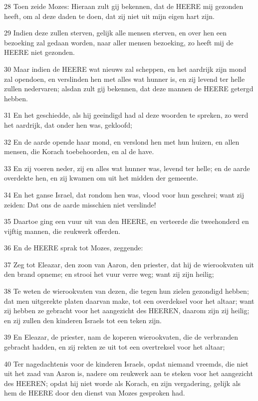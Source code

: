 \par 28 Toen zeide Mozes: Hieraan zult gij bekennen, dat de HEERE mij gezonden heeft, om al deze daden te doen, dat zij niet uit mijn eigen hart zijn.
\par 29 Indien deze zullen sterven, gelijk alle mensen sterven, en over hen een bezoeking zal gedaan worden, naar aller mensen bezoeking, zo heeft mij de HEERE niet gezonden.
\par 30 Maar indien de HEERE wat nieuws zal scheppen, en het aardrijk zijn mond zal opendoen, en verslinden hen met alles wat hunner is, en zij levend ter helle zullen nedervaren; alsdan zult gij bekennen, dat deze mannen de HEERE getergd hebben.
\par 31 En het geschiedde, als hij geeindigd had al deze woorden te spreken, zo werd het aardrijk, dat onder hen was, gekloofd;
\par 32 En de aarde opende haar mond, en verslond hen met hun huizen, en allen mensen, die Korach toebehoorden, en al de have.
\par 33 En zij voeren neder, zij en alles wat hunner was, levend ter helle; en de aarde overdekte hen, en zij kwamen om uit het midden der gemeente.
\par 34 En het ganse Israel, dat rondom hen was, vlood voor hun geschrei; want zij zeiden: Dat ons de aarde misschien niet verslinde!
\par 35 Daartoe ging een vuur uit van den HEERE, en verteerde die tweehonderd en vijftig mannen, die reukwerk offerden.
\par 36 En de HEERE sprak tot Mozes, zeggende:
\par 37 Zeg tot Eleazar, den zoon van Aaron, den priester, dat hij de wierookvaten uit den brand opneme; en strooi het vuur verre weg; want zij zijn heilig;
\par 38 Te weten de wierookvaten van dezen, die tegen hun zielen gezondigd hebben; dat men uitgerekte platen daarvan make, tot een overdeksel voor het altaar; want zij hebben ze gebracht voor het aangezicht des HEEREN, daarom zijn zij heilig; en zij zullen den kinderen Israels tot een teken zijn.
\par 39 En Eleazar, de priester, nam de koperen wierookvaten, die de verbranden gebracht hadden, en zij rekten ze uit tot een overtreksel voor het altaar;
\par 40 Ter nagedachtenis voor de kinderen Israels, opdat niemand vreemds, die niet uit het zaad van Aaron is, nadere om reukwerk aan te steken voor het aangezicht des HEEREN; opdat hij niet worde als Korach, en zijn vergadering, gelijk als hem de HEERE door den dienst van Mozes gesproken had.
